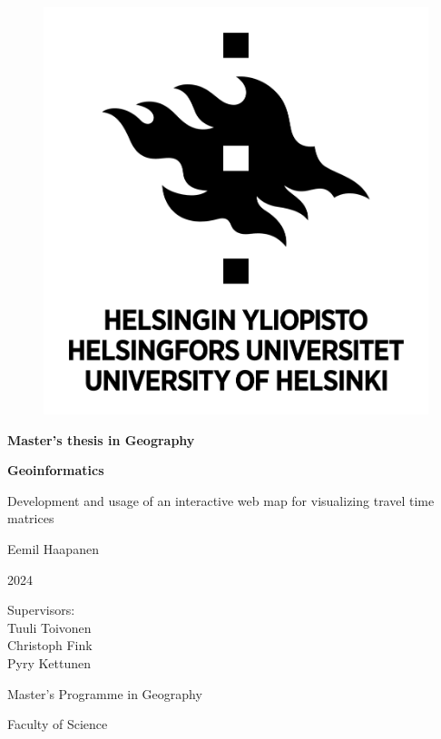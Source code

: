 \begin{titlepage}{
    \centering
    
    \begin{figure}[H]
        \centering
        \includegraphics[scale=0.4]{visual/other/helsinki_uni_logo.jpg}
    \end{figure}
    
    \bigskip
    \bigskip
    \bigskip
    \textbf{Master's thesis in Geography} \par
    \textbf{Geoinformatics} \par
    
    \bigskip
    \bigskip
    Development and usage of an interactive web map for visualizing travel time matrices
    
    \bigskip
    \bigskip
    Eemil Haapanen
    
    2024
    
    \vfill
    
    Supervisors: \\
    Tuuli Toivonen \\
	Christoph Fink \\
	Pyry Kettunen \par
    \bigskip
    \bigskip
    \bigskip
    Master's Programme in Geography \par
    Faculty of Science \par
}
\end{titlepage}
